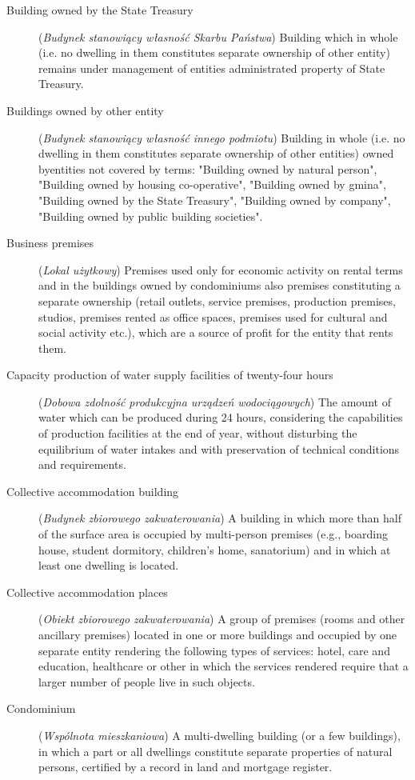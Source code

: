 \documentclass[12pt,a4paper]{article}
\begin{document}
\begin{description}
\item[Building owned by the State Treasury] (\textit{Budynek stanowiący własność Skarbu Państwa}) Building which in whole (i.e. no dwelling in them constitutes separate ownership of other entity) remains under management of entities administrated property of State Treasury.
\item[Buildings owned by other entity] (\textit{Budynek stanowiący własność innego podmiotu}) Building in whole (i.e. no dwelling in them constitutes separate ownership of other entities) owned byentities not covered by terms: "Building owned by natural person", "Building owned by housing co-operative", "Building owned by gmina", "Building owned by the State Treasury", "Building owned by company", "Building owned by public building societies".
\item[Business premises] (\textit{Lokal użytkowy}) Premises used only for economic activity on rental terms and in the buildings owned by condominiums also premises constituting a separate ownership (retail outlets, service premises, production premises, studios, premises rented as office spaces, premises used for cultural and social activity etc.), which are a source of profit for the entity that rents them.
\item[Capacity production of water supply facilities of twenty-four hours] (\textit{Dobowa zdolność produkcyjna urządzeń wodociągowych}) The amount of water which can be produced during 24 hours, considering the capabilities of production facilities at the end of year, without disturbing the equilibrium of water intakes and with preservation of technical conditions and requirements.
\item[Collective accommodation building] (\textit{Budynek zbiorowego zakwaterowania}) A building in which more than half of the surface area is occupied by multi-person premises (e.g., boarding house, student dormitory, children's home, sanatorium) and in which at least one dwelling is located.
\item[Collective accommodation places] (\textit{Obiekt zbiorowego zakwaterowania}) A group of premises (rooms and other ancillary premises) located in one or more buildings and occupied by one separate entity rendering the following types of services: hotel, care and education, healthcare or other in which the services rendered require that a larger number of people live in such objects.
\item[Condominium] (\textit{Wspólnota mieszkaniowa}) A multi-dwelling building (or a few buildings), in which a part or all dwellings constitute separate properties of natural persons, certified by a record in land and mortgage register.

\end{description}
\end{document}
